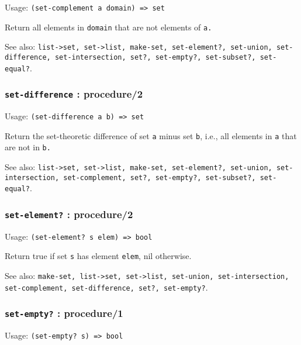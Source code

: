 \documentclass[
]{article}
\newcommand{\passthrough}[1]{#1}
\begin{document}
Usage: \passthrough{\lstinline!(set-complement a domain) => set!}

Return all elements in \passthrough{\lstinline!domain!} that are not
elements of \passthrough{\lstinline!a.!}

See also:
\passthrough{\lstinline!list->set, set->list, make-set, set-element?, set-union, set-difference, set-intersection, set?, set-empty?, set-subset?, set-equal?!}.

\hypertarget{set-difference-procedure2}{%
\subsubsection{\texorpdfstring{\texttt{set-difference} :
procedure/2}{set-difference : procedure/2}}\label{set-difference-procedure2}}

Usage: \passthrough{\lstinline!(set-difference a b) => set!}

Return the set-theoretic difference of set \passthrough{\lstinline!a!}
minus set \passthrough{\lstinline!b!}, i.e., all elements in
\passthrough{\lstinline!a!} that are not in \passthrough{\lstinline!b.!}

See also:
\passthrough{\lstinline!list->set, set->list, make-set, set-element?, set-union, set-intersection, set-complement, set?, set-empty?, set-subset?, set-equal?!}.

\hypertarget{set-element-procedure2}{%
\subsubsection{\texorpdfstring{\texttt{set-element?} :
procedure/2}{set-element? : procedure/2}}\label{set-element-procedure2}}

Usage: \passthrough{\lstinline!(set-element? s elem) => bool!}

Return true if set \passthrough{\lstinline!s!} has element
\passthrough{\lstinline!elem!}, nil otherwise.

See also:
\passthrough{\lstinline!make-set, list->set, set->list, set-union, set-intersection, set-complement, set-difference, set?, set-empty?!}.

\hypertarget{set-empty-procedure1}{%
\subsubsection{\texorpdfstring{\texttt{set-empty?} :
procedure/1}{set-empty? : procedure/1}}\label{set-empty-procedure1}}

Usage: \passthrough{\lstinline!(set-empty? s) => bool!}
\end{document}
